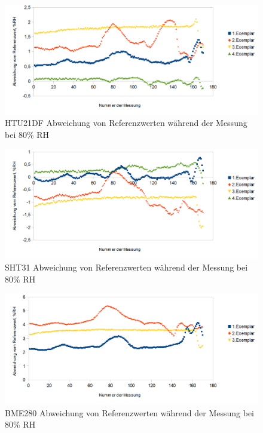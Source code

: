 \documentclass[runningheads]{llncs}
\begin{document}
\begin{figure}[h]
\includegraphics[width=\textwidth]{pictures/HTU21D_80.png}
\caption{HTU21DF Abweichung von Referenzwerten während der Messung bei 80\% RH}
\end{figure}

\begin{figure}[h]
\includegraphics[width=\textwidth]{pictures/SHT31_80.png}
\caption{SHT31 Abweichung von Referenzwerten während der Messung bei 80\% RH}
\end{figure}


\begin{figure}[h]
\includegraphics[width=\textwidth]{pictures/BME280_80.png}
\caption{BME280 Abweichung von Referenzwerten während der Messung bei 80\% RH}
\end{figure}
\end{document}
